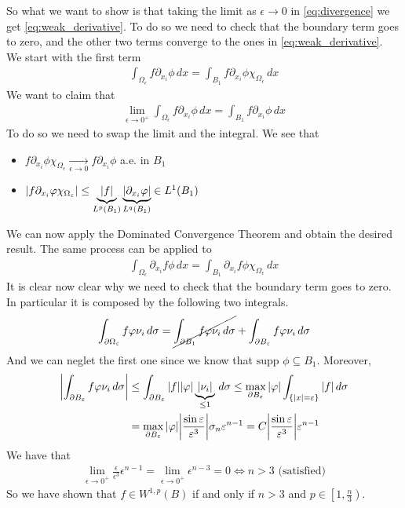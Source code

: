 So what we want to show is that taking the limit as \(\epsilon \to 0\) in \eqref{eq:divergence} we get \eqref{eq:weak_derivative}. 
To do so we need to check that the boundary term goes to zero, and the other two terms converge to the ones in \eqref{eq:weak_derivative}. \\
We start with the first term
\[ 
    \begin{split}
        \int_{\Omega_\epsilon} f \partial_{x_i} \phi \, dx = \int_{B_1} f \partial_{x_i} \phi \chi_{\Omega_\epsilon} \, dx
    \end{split}
\]
We want to claim that 
\[
    \begin{split}
        \lim_{\epsilon \to 0^+} \int_{\Omega_\epsilon} f \partial_{x_i} \phi \, dx = \int_{B_1} f \partial_{x_i} \phi \, dx
    \end{split}
\]
To do so we need to swap the limit and the integral. We see that 
\begin{itemize}
    \item \(f \partial_{x_i} \phi \chi_{\Omega_\epsilon} \underset{\epsilon \to 0}{\longrightarrow} f \partial_{x_i} \phi\) a.e. in \(B_1\)
    \item \(\abs{f \partial_{x_i} \phi \chi_{\Omega_\epsilon}} \leq \underbrace{\abs{f}}_{L^p(B_1)} \underbrace{\abs{\partial_{x_i} \phi}}_{L^q(B_1)} \in L^1(B_1)\)
\end{itemize}
We can now apply the Dominated Convergence Theorem and obtain the desired result. 
The same process can be applied to
\[
    \begin{split}
        \int_{\Omega_\epsilon} \partial_{x_i} f \phi \, dx = \int_{B_1} \partial_{x_i} f \phi \chi_{\Omega_\epsilon} \, dx
    \end{split}
\]
It is clear now clear why we need to check that the boundary term goes to zero. In particular it is composed by the following two integrals.
\[
    \begin{split}
        \int_{\partial\Omega_\epsilon} f \phi \nu_i \, d\sigma = \cancel{\int_{\partial B_1} f \phi \nu_i \, d\sigma} + \int_{\partial B_\epsilon} f \phi \nu_i \, d\sigma    
    \end{split}
\]
And we can neglet the first one since we know that \(\text{supp } \phi \subseteq B_1\).
Moreover,
\[
    \begin{split}
        \abs{\int_{\partial B_\epsilon} f \phi \nu_i \, d\sigma} & \leq \int_{\partial B_\epsilon} \abs{f} \abs{\phi} \underbrace{\abs{\nu_i}}_{\leq 1} \, d\sigma \leq \max_{\partial B_\epsilon} \abs{\phi} \int_{\{ \abs{x} = \epsilon \}} \abs{f} \, d\sigma \\
                                                                 & = \max_{\partial B_\epsilon} \abs{\phi} \abs{\frac{\sin\epsilon}{\epsilon^3}} \sigma_n \epsilon^{n-1} = C \abs{\frac{\sin\epsilon}{\epsilon^3}} \epsilon^{n-1}
    \end{split}
\]
We have that 
\[
    \begin{split}
        \lim_{\epsilon \to 0^+} \frac{\epsilon}{\epsilon^3} \epsilon^{n-1} = \lim_{\epsilon \to 0^+} \epsilon^{n-3} = 0 \iff n > 3 \text{ (satisfied)}
    \end{split}
\]
So we have shown that $f \in W^{1, p}(B)$ if and only if $n>3$ and $p \in \left[1, \frac{n}{3}\right)$.

